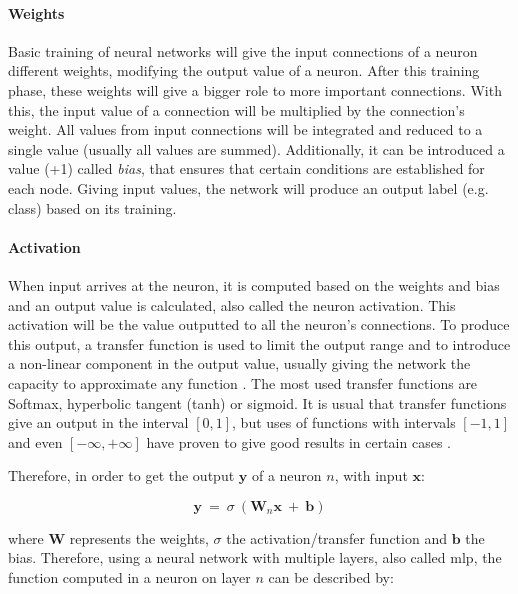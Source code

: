 \documentclass[
  twoside,
  11pt, a4paper,
  footinclude=true,
  headinclude=true,
  cleardoublepage=empty
]{scrbook}
\begin{document}
        \paragraph{Weights}
          Basic training of neural networks will give the input connections of a neuron different weights, modifying the output value of a neuron. After this training phase, these weights will give a bigger role to more important connections. With this, the input value of a connection will be multiplied by the connection's weight. All values from input connections will be integrated and reduced to a single value (usually all values are summed). Additionally, it can be introduced a value (+1) called \textit{bias}, that ensures that certain conditions are established for each node. Giving input values, the network will produce an output label (e.g. class) based on its training.

        \paragraph{Activation}
          When input arrives at the neuron, it is computed based on the weights and bias and an output value is calculated, also called the neuron activation. This activation will be the value outputted to all the neuron's connections. To produce this output, a transfer function is used to limit the output range and to introduce a non-linear component in the output value, usually giving the network the capacity to approximate any function \cite{leshno1993multilayer}. The most used transfer functions are Softmax, hyperbolic tangent (tanh) or sigmoid. It is usual that transfer functions give an output in the interval $[0,1]$, but uses of functions with intervals $[-1,1]$ and even $[-\infty,+\infty]$ have proven to give good results in certain cases \cite{karlik2011performance}.

          Therefore, in order to get the output $\boldsymbol{y}$ of a neuron $n$, with input $\boldsymbol{x}$:

          \begin{equation}
            \boldsymbol{y}\ =\ \sigma\ (\boldsymbol{W}_n\boldsymbol{x}\ +\ \boldsymbol{b})
          \end{equation}

          where $\boldsymbol{W}$ represents the weights, $\sigma$ the activation/transfer function and $\boldsymbol{b}$ the bias. Therefore, using a neural network with multiple layers, also called \gls{mlp}, the function computed in a neuron on layer $n$ can be described by:
\end{document}
